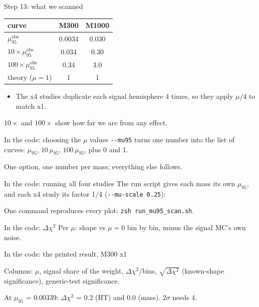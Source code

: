 \documentclass[aspectratio=169,12pt]{beamer}
\newcommand{\codesource}[1]{\par\vspace{0.2em}{\tiny\color{softgray} from #1}\par}
\newcommand{\muobs}{\mu_{95}^{\text{obs}}}
\newcommand{\takeaway}[1]{\vfill
  \colorbox{boxbg}{\parbox{0.96\textwidth}{\centering\vspace{0.3em}#1\vspace{0.3em}}}
  \par\vspace{0.6em}}
\begin{document}
\begin{frame}{Step 13: what we scanned}
  \centering
  \begin{tabular}{lcc}
    \toprule
    curve & M300 & M1000 \\
    \midrule
    $\muobs$                 & 0.0034 & 0.030 \\
    $10 \times \muobs$       & 0.034  & 0.30 \\
    $100 \times \muobs$      & 0.34   & 3.0 \\
    theory ($\mu = 1$)       & 1      & 1 \\
    \bottomrule
  \end{tabular}
  \vspace{1em}
  \begin{itemize}
    \item The x4 studies duplicate each signal hemisphere 4 times, so they apply
          $\mu/4$ to match x1.
  \end{itemize}
  \takeaway{$10\times$ and $100\times$ show how far we are from any effect.}
\end{frame}

\begin{frame}{In the code: choosing the $\mu$ values}
  \texttt{-{}-mu95} turns one number into the list of curves:
  $\mu_{95}$, $10\,\mu_{95}$, $100\,\mu_{95}$, plus 0 and 1.
  \vspace{0.4em}
  \snipmuargs
  \codesource{\srcmuargs}
  \takeaway{One option, one number per mass; everything else follows.}
\end{frame}

\begin{frame}{In the code: running all four studies}
  The run script gives each mass its own $\mu_{95}$, and each x4 study its
  factor 1/4 (\texttt{-{}-mu-scale 0.25}):
  \vspace{0.4em}
  \sniprunloop
  \codesource{\srcrunloop}
  \takeaway{One command reproduces every plot: \texttt{zsh run\_mu95\_scan.sh}.}
\end{frame}

\begin{frame}{In the code: $\Delta\chi^2$}
  Per $\mu$: shape vs $\mu = 0$ bin by bin, minus the signal MC's own noise.
  \vspace{0.2em}
  {\lstset{basicstyle=\ttfamily\tiny}\snipdchisq}
  \codesource{\srcdchisq}
\end{frame}

\begin{frame}{In the code: the printed result, M300 x1}
  \vspace{0.4em}
  \snipscanout
  \codesource{\srcscanout}
  \vspace{0.4em}
  Columns: $\mu$, signal share of the weight, $\Delta\chi^2$/bins,
  $\sqrt{\Delta\chi^2}$ (known-shape significance), generic-test significance.
  \takeaway{At $\mu_{95}$ = 0.00339: $\Delta\chi^2$ = 0.2 (HT) and 0.0 (mass).
  2$\sigma$ needs 4.}
\end{frame}
\end{document}
